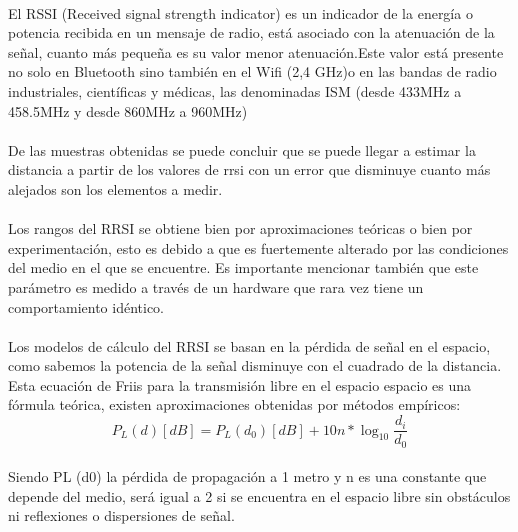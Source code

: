\documentclass[a4paper ,12pt, onecolumn]{article}
\begin{document}
                \paragraph{}
                El RSSI (Received signal strength indicator) es un indicador de la energía o potencia recibida en un mensaje de radio, 
                está asociado con la atenuación de la señal, cuanto más pequeña es su valor menor atenuación.Este valor está 
                presente no solo en Bluetooth sino también en el Wifi (2,4 GHz)o en las bandas de radio industriales, científicas y médicas,
                las denominadas ISM (desde 433MHz a 458.5MHz y desde 860MHz a 960MHz)
                \paragraph{}
                De las muestras obtenidas se puede concluir que se puede llegar a estimar la distancia a partir de los valores
                de rrsi con un error que disminuye cuanto más alejados son los elementos a medir. 
                \paragraph{}
                Los rangos del RRSI se obtiene bien por aproximaciones teóricas o bien por experimentación, esto es debido a que 
                es fuertemente alterado por las condiciones del medio en el que se encuentre. Es importante mencionar también que
                este parámetro es medido a través de un hardware que rara vez tiene un comportamiento idéntico.
                \paragraph{}
                Los modelos de cálculo del RRSI se basan en la pérdida de señal en el espacio, como sabemos la potencia de la señal
                disminuye con el cuadrado de la distancia. Esta ecuación de Friis para la transmisión libre en el espacio espacio es 
                una fórmula teórica, existen aproximaciones obtenidas por métodos empíricos:
                \begin{equation}
                    P_L(d) [dB] = P_L(d_0) [dB] + 10n *\log_{10} \frac{ d_i }{d_0} 
                \end{equation}
                \paragraph{}
                Siendo PL (d0)  la pérdida de propagación a 1 metro y n es una constante que depende del medio, será igual
                a 2 si se encuentra en el espacio libre sin obstáculos ni reflexiones o dispersiones de señal.
\end{document}
